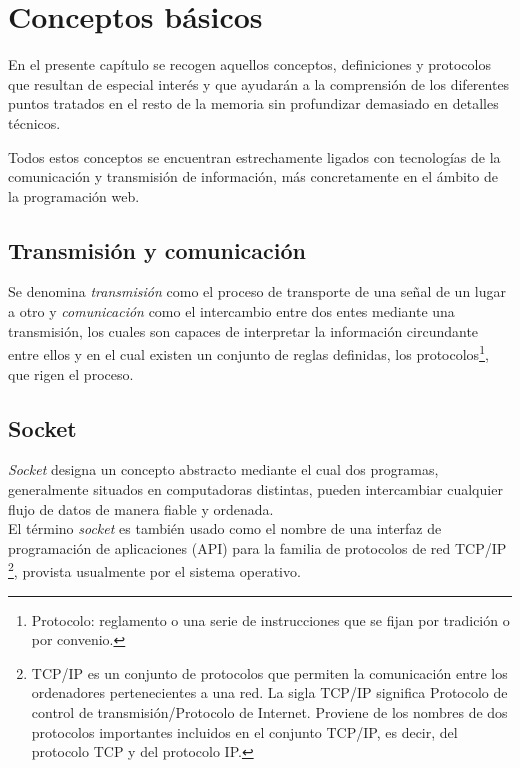 

\chapter{Conceptos básicos}
\label{chap:conceptos-básicos}


En el presente capítulo se recogen aquellos conceptos, definiciones y protocolos que resultan de especial interés y que ayudarán a la comprensión de los diferentes puntos tratados en el resto de 
la memoria sin profundizar demasiado en detalles técnicos.

Todos estos conceptos se encuentran estrechamente ligados con tecnologías de la comunicación y transmisión de información, más concretamente en el ámbito de la programación web.

\section{Transmisión y comunicación}
\label{sec:transmisión}

Se denomina \emph{transmisión} como el proceso de transporte de una señal de un lugar a otro y \emph{comunicación} como el intercambio entre dos entes mediante una transmisión, los cuales son capaces de
interpretar la información circundante entre ellos y en el cual existen un conjunto de reglas definidas, los protocolos\footnote{Protocolo: reglamento o una serie de instrucciones que se fijan por tradición o por convenio. },
que rigen el proceso.


\section{Socket}
\label{sec:def-socket}

\emph{Socket} designa un concepto abstracto mediante el cual dos programas, generalmente situados en computadoras distintas, pueden intercambiar cualquier flujo de datos de manera fiable y ordenada.\\

El término \emph{socket} es también usado como el nombre de una interfaz de programación de aplicaciones (API) para la familia de protocolos de red TCP/IP \footnote{ TCP/IP es un conjunto de protocolos que
permiten la comunicación entre los ordenadores pertenecientes a una red. La sigla TCP/IP significa Protocolo de control de transmisión/Protocolo de Internet. Proviene de los nombres de dos protocolos 
importantes incluidos en el conjunto TCP/IP, es decir, del protocolo TCP y del protocolo IP. }, provista usualmente por el sistema operativo.\\

